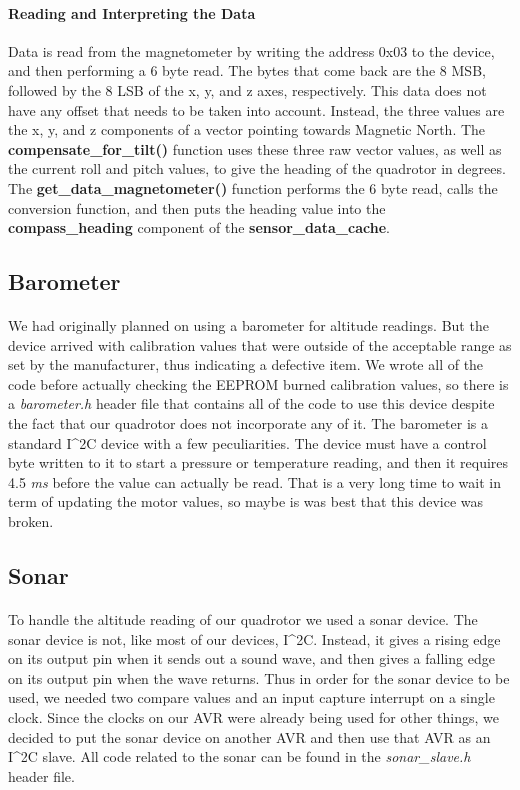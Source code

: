 \paragraph{Reading and Interpreting the Data}
Data is read from the magnetometer by writing the address 0x03 to the device, and then performing a 6 byte read.  The bytes that come back are the 8 MSB, followed by the 8 LSB of the x, y, and z axes, respectively.  This data does not have any offset that needs to be taken into account.  Instead, the three values are the x, y, and z components of a vector pointing towards Magnetic North.  The {\bf compensate_for_tilt()} function uses these three raw vector values, as well as the current roll and pitch values, to give the heading of the  quadrotor in degrees.  The {\bf get_data_magnetometer()} function performs the 6 byte read, calls the conversion function, and then puts the heading value into the {\bf compass_heading} component of the {\bf sensor_data_cache}.

\subsection{Barometer}

\paragraph{}
We had originally planned on using a barometer for altitude readings.  But the device arrived with calibration values that were outside of the acceptable range as set by the manufacturer, thus indicating a defective item.  We wrote all of the code before actually checking the EEPROM burned calibration values, so there is a {\it barometer.h} header file that contains all of the code to use this device despite the fact that our quadrotor does not incorporate any of it.  The barometer is a standard I^{2}C device with a few peculiarities.  The device must have a control byte written to it to start a pressure or temperature reading, and then it requires 4.5 {\it ms} before the value can actually be read.  That is a very long time to wait in term of updating the motor values, so maybe is was best that this device was broken.

\subsection{Sonar}

\paragraph{}
To handle the altitude reading of our quadrotor we used a sonar device.  The sonar device is not, like most of our devices, I^{2}C.  Instead, it gives a rising edge on its output pin when it sends out a sound wave, and then gives a falling edge on its output pin when the wave returns.  Thus in order for the sonar device to be used, we needed two compare values and an input capture interrupt on a single clock.  Since the clocks on our AVR were already being used for other things, we decided to put the sonar device on another AVR and then use that AVR as an I^{2}C slave.  All code related to the sonar can be found in the {\it sonar_slave.h} header file.

